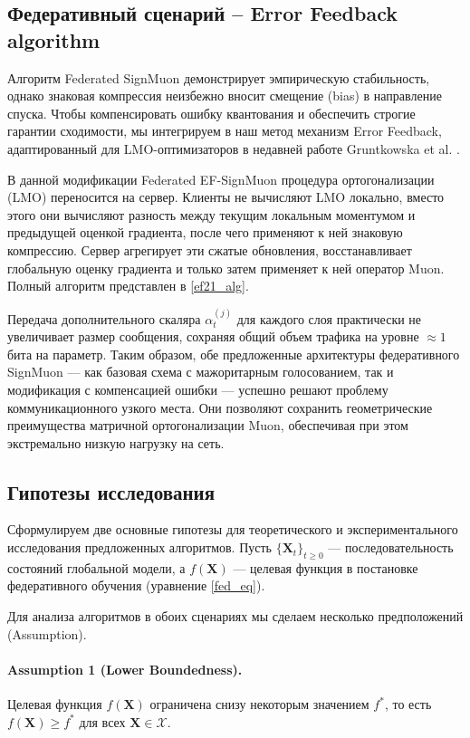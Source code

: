 \documentclass{article}
\begin{document}
\subsection{Федеративный сценарий -- Error Feedback algorithm}
Алгоритм Federated SignMuon демонстрирует эмпирическую стабильность, однако знаковая компрессия неизбежно вносит смещение (bias) в направление спуска. Чтобы компенсировать ошибку квантования и обеспечить строгие гарантии сходимости, мы интегрируем в наш метод механизм Error Feedback, адаптированный для LMO-оптимизаторов в недавней работе Gruntkowska et al. \cite{gruntkowska2025error}. 

В данной модификации Federated EF-SignMuon процедура ортогонализации (LMO) переносится на сервер. Клиенты не вычисляют LMO локально, вместо этого они вычисляют разность между текущим локальным моментумом и предыдущей оценкой градиента, после чего применяют к ней знаковую компрессию. Сервер агрегирует эти сжатые обновления, восстанавливает глобальную оценку градиента и только затем применяет к ней оператор Muon. Полный алгоритм представлен в \cref{ef21_alg}.

Передача дополнительного скаляра $\alpha_t^{(j)}$ для каждого слоя практически не увеличивает размер сообщения, сохраняя общий объем трафика на уровне $\approx 1$ бита на параметр. Таким образом, обе предложенные архитектуры федеративного SignMuon — как базовая схема с мажоритарным голосованием, так и модификация с компенсацией ошибки — успешно решают проблему коммуникационного узкого места. Они позволяют сохранить геометрические преимущества матричной ортогонализации Muon, обеспечивая при этом экстремально низкую нагрузку на сеть.

\subsection{Гипотезы исследования}
Сформулируем две основные гипотезы для теоретического и экспериментального исследования предложенных алгоритмов. Пусть $\{\mathbf{X}_t\}_{t\ge 0}$ — последовательность состояний глобальной модели, а $f(\mathbf{X})$ — целевая функция в постановке федеративного обучения (уравнение \ref{fed_eq}).

Для анализа алгоритмов в обоих сценариях мы сделаем несколько предположений (Assumption). 
\paragraph{Assumption 1 (Lower Boundedness).} Целевая функция $f(\mathbf{X})$ ограничена снизу некоторым значением $f^*$, то есть $f(\mathbf{X}) \ge f^*$ для всех $\mathbf{X} \in \mathcal{X}$.
\end{document}
